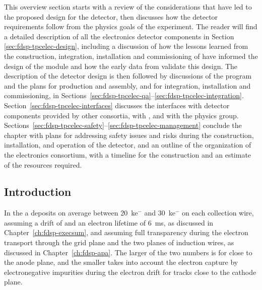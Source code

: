This overview section starts with a review of the considerations that
have led to the proposed design for the   detector, 
then discusses how the detector requirements follow from the physics goals 
of the experiment. The reader will find a detailed description of all the 
 electronics detector components in Section \ref{sec:fdsp-tpcelec-design},
including a discussion of how the lessons learned from the construction,
integration, installation and commissioning of  have informed
the design of the   module and how the early data
from  validate this design. The description of the detector
design is then followed by discussions 
of the  program and the plans for production and assembly, 
and for integration, installation and commissioning, in 
Sections~\ref{sec:fdsp-tpcelec-qa}--\ref{sec:fdsp-tpcelec-integration}. 
Section~\ref{sec:fdsp-tpcelec-interfaces} discusses the interfaces with 
detector components provided by other consortia, with , and with the physics group. 
Sections~\ref{sec:fdsp-tpcelec-safety}--\ref{sec:fdsp-tpcelec-management} 
conclude the chapter with plans for addressing safety issues and risks during the
construction, installation, and operation of the detector, and 
an outline of the organization of the  electronics consortium, 
with a timeline for the  construction and an estimate
of the resources required.

\subsection{Introduction}
\label{sec:fdsp-tpcelec-overview-intro}

In the   a  deposits on average between
\SI{20}{k}{e$^-$} and \SI{30}{k}{e$^-$} on each collection wire, assuming a drift \efield
of \spmaxfield and an electron lifetime of \SI{6}{ms}, as discussed in
Chapter~\ref{ch:fdsp-execsum}, and assuming full transparency during the 
electron transport through the grid plane and the two planes of induction
wires, as discussed in Chapter~\ref{ch:fdsp-apa}. The larger of the two numbers 
is for  close to the anode plane, and the smaller
takes into account the electron capture by electronegative impurities during the electron
drift for tracks close to the cathode plane. 

